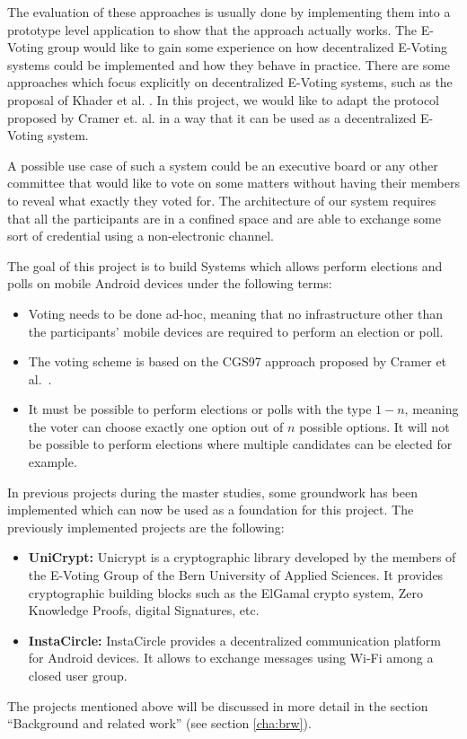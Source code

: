 \documentclass[numbers=noenddot, abstract=on, a4paper, headsepline,
footsepline, oneside, draft=off]{scrreprt}
\newcommand{\myref}[1]{(see section \vref{#1})}
\begin{document}
The evaluation of these approaches is usually done by implementing them into a
prototype level application to show that the approach actually works. The
E-Voting group would like to gain some experience on how decentralized E-Voting
systems could be implemented and how they behave in practice. There are some
approaches which focus explicitly on decentralized E-Voting systems, such as the
proposal of Khader et al. \cite{HKRS12}. In this project, we would like to adapt
the protocol proposed by Cramer et. al. \cite{CGS97} in a way that it can be
used as a decentralized E-Voting system.

A possible use case of such a system could be an executive board or any other
committee that would like to vote on some matters without having their members
to reveal what exactly they voted for. The architecture of our system requires
that all the participants are in a confined space and are able to exchange some
sort of credential using a non-electronic channel.

The goal of this project is to build Systems which allows perform elections and
polls on mobile Android devices under the following terms:
\begin{itemize}
  \item Voting needs to be done ad-hoc, meaning that no infrastructure other
  than the participants' mobile devices are required to perform an election or
  poll.
  \item The voting scheme is based on the CGS97 approach proposed by Cramer et
  al.~\cite{CGS97}.
  \item It must be possible to perform elections or polls with the type $1-n$,
  meaning the voter can choose exactly one option out of $n$ possible options.
  It will not be possible to perform elections where multiple candidates can be
  elected for example.
\end{itemize}

In previous projects during the master studies, some groundwork has been
implemented which can now be used as a foundation for this project. The
previously implemented projects are the following:
\begin{itemize}
  \item \textbf{UniCrypt:} Unicrypt is a cryptographic library developed by the
  members of the E-Voting Group of the Bern University of Applied Sciences. It
  provides cryptographic building blocks such as the ElGamal crypto system, Zero
  Knowledge Proofs, digital Signatures, etc. 
  \item \textbf{InstaCircle: } InstaCircle provides a decentralized
  communication platform for Android devices. It allows to exchange messages
  using Wi-Fi among a closed user group.
\end{itemize}
The projects mentioned above will be discussed in more detail in the section
``Background and related work'' \myref{cha:brw}.
\end{document}
